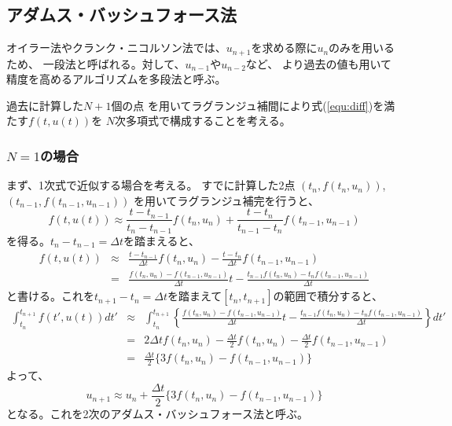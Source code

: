 \documentclass[a4j, titlepage]{jsarticle}
\numberwithin{equation}{section}
\begin{document}
    \subsection{アダムス・バッシュフォース法}
        オイラー法やクランク・ニコルソン法では、$u_{n+1}$を求める際に$u_{n}$のみを用いるため、
        一段法と呼ばれる。対して、$u_{n-1}$や$u_{n-2}$など、
        より過去の値も用いて精度を高めるアルゴリズムを多段法と呼ぶ。

        過去に計算した$N+1$個の点
        を用いてラグランジュ補間により式(\ref{equ:diff})を満たす$f(t, u(t))$を
        $N$次多項式で構成することを考える。

        \subsubsection{$N=1$の場合}
            まず、1次式で近似する場合を考える。
            すでに計算した2点
            $(t_n, f(t_n, u_n))$,
            $(t_{n-1}, f(t_{n-1}, u_{n-1}))$
            を用いてラグランジュ補完を行うと、
            \begin{equation*}
                f(t, u(t)) \approx \frac{t - t_{n-1}}{t_n - t_{n-1}}f(t_n, u_n) + \frac{t - t_n}{t_{n-1} - t_n}f(t_{n-1}, u_{n-1})
            \end{equation*}
            を得る。$t_n - t_{n-1} = \Delta t$を踏まえると、
            \begin{eqnarray*}
                f(t, u(t)) &\approx& \frac{t - t_{n-1}}{\Delta t}f(t_n, u_n) - \frac{t - t_n}{\Delta t}f(t_{n-1}, u_{n-1}) \\
                &=& \frac{f(t_n, u_n) - f(t_{n-1}, u_{n-1})}{\Delta t}t - \frac{t_{n-1}f(t_n, u_n) - t_nf(t_{n-1}, u_{n-1})}{\Delta t}
            \end{eqnarray*}
            と書ける。これを$t_{n+1} - t_{n} = \Delta t$を踏まえて$[t_n, t_{n+1}]$の範囲で積分すると、
            \begin{eqnarray*}
                \int^{t_{n+1}}_{t_n} f(t', u(t)) dt' &\approx& \int^{t_{n+1}}_{t_n} \left\{ \frac{f(t_n, u_n) - f(t_{n-1}, u_{n-1})}{\Delta t}t - \frac{t_{n-1}f(t_n, u_n) - t_nf(t_{n-1}, u_{n-1})}{\Delta t} \right\} dt' \\
                &=& 2\Delta t f(t_n, u_n) - \frac{\Delta t}{2} f(t_n, u_n) - \frac{\Delta t}{2} f(t_{n-1}, u_{n-1}) \\
                &=& \frac{\Delta t}{2} \{3f(t_n, u_n) - f(t_{n-1}, u_{n-1})\}
            \end{eqnarray*}
            よって、
            \begin{equation}
                u_{n+1} \approx u_n + \frac{\Delta t}{2} \{3f(t_n, u_n) - f(t_{n-1}, u_{n-1})\}
            \end{equation}
            となる。これを2次のアダムス・バッシュフォース法と呼ぶ。
\end{document}
